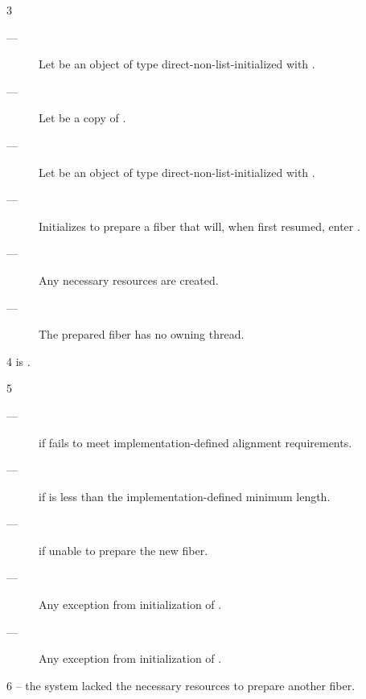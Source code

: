 3 \effects
\begin{description}
    \item[---] Let  be an object of
               type  direct-non-list-initialized
               with . 
    \item[---] Let  be a copy of .
    \item[---] Let  be an object of
               type  direct-non-list-initialized
               with . 
    \item[---] Initializes  to prepare a fiber that will, when
               first resumed, enter .
    \item[---] Any necessary resources are created.
    \item[---] The prepared fiber has no owning thread.
\end{description}

4 \postcond
\emptyfn is \false.

5 \except
\begin{description}
    \item[---]  if  fails to meet
               implementation-defined alignment requirements.
    \item[---]  if  is less than the
               implementation-defined minimum length.
    \item[---]  if unable to prepare the new fiber.
    \item[---] Any exception from initialization of .
    \item[---] Any exception from initialization of .
\end{description}

6 \errors
{} -- the system lacked the necessary resources to prepare another fiber.


